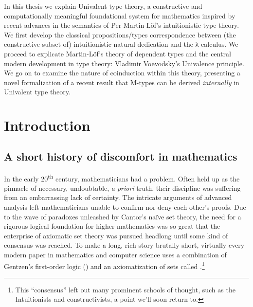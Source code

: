 \documentclass[12pt,twoside]{reedthesis}
\begin{document}
In this thesis we explain Univalent type theory, a constructive and
computationally meaningful foundational system for mathematics inspired by
recent advances in the semantics of Per Martin-L\"of's intuitionistic type
theory. We first develop the classical propositions/types correspondence between
(the constructive subset of) intuitionistic natural dedication and the
λ-calculus. We proceed to explicate Martin-L\"of's theory of dependent types and
the central modern development in type theory: Vladimir Voevodsky's Univalence
principle. We go on to examine the nature of coinduction within this theory,
presenting a novel formalization of a recent result that M-types can be derived
\textit{internally} in Univalent type theory.

\mainmatter %
\pagestyle{fancyplain} %

\chapter*{Introduction}

\section*{A short history of discomfort in mathematics}


In the early 20\textsuperscript{th} century, mathematicians had a problem. Often
held up as the pinnacle of necessary, undoubtable, \textit{a priori} truth,
their discipline was suffering from an embarrassing lack of certainty. The
intricate arguments of advanced analysis left mathematicians unable to confirm
nor deny each other's proofs. Due to the wave of paradoxes unleashed by
Cantor's na\"ive set theory, the need for a rigorous logical foundation for higher
mathematics was so great that the enterprise of axiomatic set theory was pursued
headlong until some kind of consensus was reached. To make a long, rich story
brutally short, virtually every modern paper in mathematics and computer
science uses a combination of Gentzen's first-order logic (\FOL)
and an axiomatization of sets called
\ZFC.\footnote{This ``consensus'' left out many
  prominent schools of thought, such as the Intuitionists and constructivists, a
  point we'll soon return to.}
\end{document}

